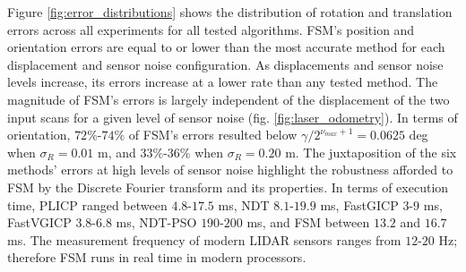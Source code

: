 \begin{figure*}
\begin{framed}
  \vspace{-0.75cm}\hspace{-0.75cm}
    \subfloat{}
    \qquad \hspace{-1.25cm}
    \subfloat{}
    \vspace{-2.5cm}
    \caption{\small Distribution of orientation and position errors across a
             range of maximal positional and orientational displacements, for
             progressively larger sensor measurement noise levels. Each boxplot
             represents $10$ iterations over $\sum|D_k| \approx
             45$$\cdot$$10^3$ random scan pairs for each configuration,
             $k=1,\dots,5$. Dots signify mean errors. FSM's errors are largely
             independent of the initial displacement of scans for a given level
             of sensor noise}%
    \label{fig:error_distributions}%
\end{framed}
\end{figure*}

Figure \ref{fig:error_distributions} shows the distribution of rotation and
translation errors across all experiments for all tested algorithms.  FSM's
position and orientation errors are equal to or lower than the most accurate
method for each displacement and sensor noise configuration. As displacements
and sensor noise levels increase, its errors increase at a lower rate than any
tested method. The magnitude of FSM's errors is largely independent of the
displacement of the two input scans for a given level of sensor noise (fig.
\ref{fig:laser_odometry}). In terms of orientation, $72\%$-$74\%$ of FSM's
errors resulted below $\gamma / 2^{\nu_{max}+1} = 0.0625$ deg when $\sigma_R =
0.01$ m, and $33\%$-$36\%$ when $\sigma_R = 0.20$ m.  The juxtaposition of the
six methods' errors at high levels of sensor noise highlight the robustness
afforded to FSM by the Discrete Fourier transform and its properties.  In terms
of execution time, PLICP ranged between $4.8$-$17.5$ ms, NDT $8.1$-$19.9$ ms,
FastGICP $3$-$9$ ms, FastVGICP $3.8$-$6.8$ ms, NDT-PSO $190$-$200$ ms, and FSM
between $13.2$ and $16.7$ ms.  The measurement frequency of modern LIDAR
sensors ranges from $12$-$20$ Hz; therefore FSM runs in real time in modern
processors.
